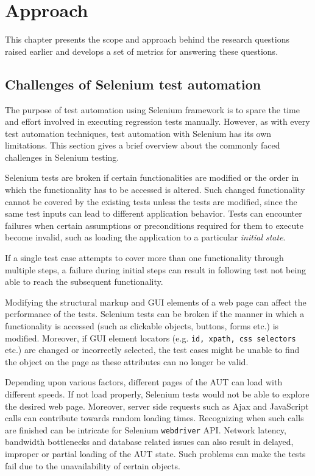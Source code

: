 \chapter{Approach} %
\label{Chapter3} %


This chapter presents the scope and approach behind the research questions raised earlier and develops a set of metrics for answering these questions.

\section{Challenges of Selenium test automation}
\label{challengesSelenium}
The purpose of test automation using Selenium framework is to spare the time and effort involved in executing regression tests manually. However, as with every test automation techniques, test automation with Selenium has its own limitations. This section gives a brief overview about the commonly faced challenges in Selenium testing.

Selenium tests are broken if certain functionalities are modified or the order in which the functionality has to be accessed is altered.
Such changed functionality cannot be covered by the existing tests unless the tests are modified, since the same test inputs can lead to different application behavior. Tests can encounter failures when certain assumptions or preconditions required for them to execute become invalid, such as loading the application to a particular \textit{initial state}.

If a single test case attempts to cover more than one functionality through multiple steps, a failure during initial steps can result in following test not being able to reach the subsequent functionality.

Modifying the structural markup and GUI elements of a web page can affect the performance of the tests. Selenium tests can be broken if the manner in which a functionality is accessed (such as clickable objects, buttons, forms etc.) is modified. Moreover, if GUI element locators (e.g. \texttt{id, xpath, css selectors} etc.) are changed or incorrectly selected, the test cases might be unable to find the object on the page as these attributes can no longer be valid.

Depending upon various factors, different pages of the AUT can load with different speeds. If not load properly, Selenium tests would not be able to explore the desired web page. Moreover, server side requests such as Ajax and JavaScript calls can contribute towards random loading times. Recognizing when such calls are finished can be intricate for Selenium \texttt{webdriver} API. Network latency, bandwidth bottlenecks and database related issues can also result in delayed, improper or partial loading of the AUT state. Such problems can make the tests fail due to the unavailability of certain objects.

